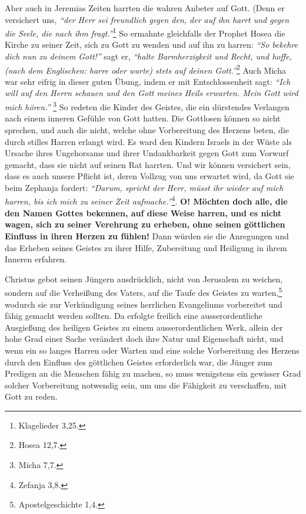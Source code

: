 \medskip

Aber auch in Jeremias Zeiten harrten die wahren
Anbeter auf Gott. (Denn er
versichert uns,
\textit{ "`der Herr sei freundlich gegen den, der auf ihn harrt und
gegen die Seele, die nach ihm fragt."'}\footnote{Klagelieder 3,25.}
So ermahnte
gleichfalls der Prophet Hosea die Kirche zu seiner Zeit,
sich zu Gott zu wenden
und auf ihn zu harren:
\textit{"`So bekehre dich nun zu deinem Gott!"'} sagt er,
\textit{"`halte
Barmherzigkeit und Recht, und hoffe, (nach dem Englischen: harre oder warte)
stets auf deinen Gott."'}\footnote{Hosea 12,7.}
Auch Micha war sehr eifrig in
dieser guten Übung, indem er mit Entschlossenheit sagt:
\textit{"`Ich will auf den
Herrn schauen und den Gott meines Heils erwarten. Mein Gott wird mich
hören."'}
\footnote{Micha 7,7.}
So redeten die Kinder des Geistes, die ein
dürstendes Verlangen nach einem inneren Gefühle von Gott hatten. Die Gottlosen
können so nicht sprechen, und auch die nicht, welche ohne Vorbereitung des
Herzens beten, die durch stilles Harren erlangt wird. Es ward den Kindern
Israels
in der Wüste als Ursache ihres Ungehorsams und ihrer Undankbarkeit
gegen Gott zum Vorwurf gemacht, dass sie nicht auf seinen Rat harrten. Und
wir können versichert sein, dass es auch unsere Pflicht ist, deren Vollzug
von uns erwartet wird, da Gott sie beim Zephanja
 fordert:
\textit{"`Darum, spricht
der Herr, müsst ihr wieder auf mich harren, bis ich mich zu seiner
Zeit aufmache."'}\footnote{Zefanja 3,8.}.
\textbf{O! Möchten doch alle, die den Namen
Gottes
bekennen, auf diese Weise harren, und es nicht wagen, sich zu seiner Verehrung
zu erheben, ohne seinen göttlichen Einfluss in ihren Herzen zu fühlen!} Dann
würden sie die Anregungen und das Erheben seines Geistes zu ihrer Hilfe,
Zubereitung
und Heiligung in ihrem Inneren erfahren.

\medskip

Christus gebot seinen Jüngern ausdrücklich, nicht von Jerusalem
 zu weichen,
sondern auf die Verheißung des Vaters, auf die Taufe des Geistes
 zu
warten,\footnote{Apostelgeschichte 1,4.}
wodurch sie zur Verkündigung seines herrlichen
Evangeliums vorbereitet und fähig gemacht werden sollten. Da erfolgte freilich
eine ausserordentliche Ausgießung des heiligen Geistes zu
einem
ausserordentlichen Werk, allein der hohe Grad einer Sache verändert doch ihre
Natur und Eigenschaft nicht, und wenn ein so langes Harren oder Warten und eine
solche Vorbereitung des Herzens durch den Einfluss des göttlichen Geistes
erforderlich war, die Jünger zum Predigen an die Menschen fähig zu machen, so
muss wenigstens ein gewisser Grad solcher Vorbereitung notwendig sein, um uns
die Fähigkeit zu verschaffen, mit Gott zu reden.

